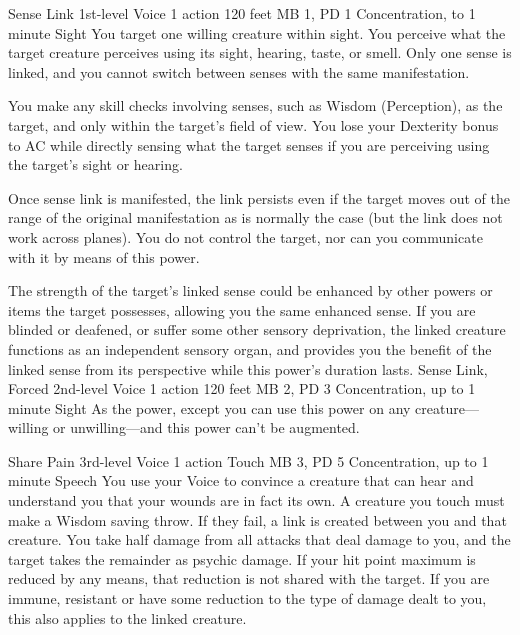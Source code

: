 \DndPowerHeader%
    {Sense Link\label{pwr:sense_link}}
    {1st-level Voice}
    {1 action}
    {120 feet}
    {MB 1, PD 1}
    {Concentration, to 1 minute}
    {Sight}
You target one willing creature within sight.
You perceive what the target creature perceives using its
sight, hearing, taste, or smell. Only one sense is linked,
and you cannot switch between senses with the same manifestation.

You make any skill checks involving senses, such as Wisdom
(Perception), as the target, and only within the target's
field of view. You lose your Dexterity bonus to AC while directly
sensing what the target senses if you are perceiving using
the target's sight or hearing.

Once sense link is manifested, the link persists even if the
target moves out of the range of the original manifestation
as is normally the case (but the link does not work across
planes). You do not control the target, nor can you communicate
with it by means of this power.

The strength of the target's linked sense could be enhanced
by other powers or items the target possesses, allowing you
the same enhanced sense. If you are blinded or deafened, or
suffer some other sensory deprivation, the linked creature
functions as an independent sensory organ, and provides you
the benefit of the linked sense from its perspective while
this power's duration lasts.
\DndPowerHeader%
    {Sense Link, Forced\label{pwr:sense_link_forced}}
    {2nd-level Voice}
    {1 action}
    {120 feet}
    {MB 2, PD 3}
    {Concentration, up to 1 minute}
    {Sight}
As the  power, except you
can use this power on any creature---willing or unwilling---and
this power can't be augmented.

\DndPowerHeader%
    {Share Pain\label{pwr:share_pain}}
    {3rd-level Voice}
    {1 action}
    {Touch}
    {MB 3, PD 5}
    {Concentration, up to 1 minute}
    {Speech}
You use your Voice to convince a creature
that can hear and understand you
that your wounds are in fact its own. A creature you touch
must make a Wisdom saving throw. If they fail, a link is created
between you and that creature. You take half damage from all
attacks that deal damage to you, and the target takes the
remainder as psychic damage. If your hit point maximum is
reduced by any means, that reduction is not shared with the
target. If you are immune, resistant or have some reduction
to the type of damage dealt to you, this also applies to the
linked creature.

